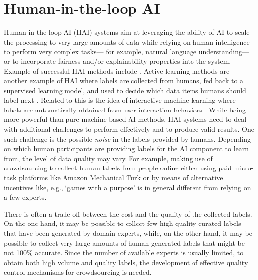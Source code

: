 \documentclass[11pt]{article}
\begin{document}
\section{Human-in-the-loop AI}
\label{sec:ai}
Human-in-the-loop AI (HAI) systems aim at leveraging the ability of AI to scale the processing to very large amounts of data while relying on human intelligence to perform very complex tasks--- for example, natural language understanding---or to incorporate fairness and/or explainability properties into the system. Example of successful HAI methods include \cite{zencrowd,crowdq,crowddb,crowdmap}. Active learning methods \cite{settles2009active} are another example of HAI where labels are collected from humans, fed back to a supervised learning model, and used to decide which data items humans should label next \cite{spina2015active}.
Related to this is the idea of interactive machine learning \cite{amershi2014power} where labels are automatically obtained from user interaction behaviors \cite{joachims2007search}.
While being more powerful than pure machine-based AI methods, HAI systems need to deal with additional challenges to perform effectively and to produce valid results. One such challenge is the possible \textit{noise} in the labels provided by humans. Depending on which human participants are providing labels for the AI component to learn from, the level of data quality may vary. For example, making use of crowdsourcing to collect human labels from people online either using paid micro-task platforms like Amazon Mechanical Turk or by means of alternative incentives like, e.g., `games with a purpose' \cite{gwap} is in general different from relying on a few experts.

There is often a trade-off between the cost and the quality of the collected labels. On the one hand, it may be possible to collect few high-quality curated labels that have been generated by domain experts, while, on the other hand, it may be possible to collect very large amounts of human-generated labels that might be not 100\% accurate. Since the number of available experts is usually limited,  to obtain both high volume and quality labels, the development of effective quality control mechanisms for crowdsourcing is needed.
\end{document}

